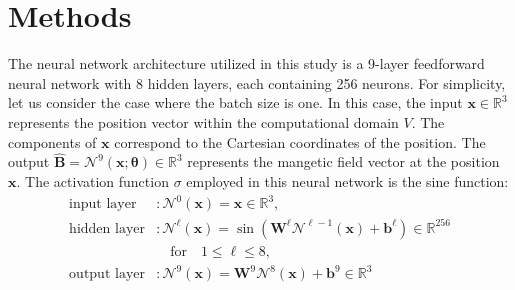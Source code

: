 
\section{Methods}



The neural network architecture utilized in this study is a 9-layer feedforward neural network with 8 hidden layers, each containing 256 neurons. For simplicity, let us consider the case where the batch size is one. In this case, the input $\boldsymbol{x} \in \mathbb{R}^3$ represents the position vector within the computational domain $V$. The components of $\boldsymbol{x}$ correspond to the Cartesian coordinates of the position. The output $\mathbf{\hat{B}}=\mathcal{N}^{9}(\boldsymbol{x}; \boldsymbol{\theta}) \in \mathbb{R}^{3}$ represents the mangetic field vector at the position $\boldsymbol{x}$. The activation function $\sigma$ employed in this neural network is the sine function:
\begin{align*}
    \text{input layer} &: \mathcal{N}^{0}(\boldsymbol{x}) = \boldsymbol{x} \in \mathbb{R}^{3}, \\
    \text{hidden layer} &: \mathcal{N}^{\ell}(\boldsymbol{x}) = \sin(\boldsymbol{W}^{\ell}\mathcal{N}^{\ell-1}(\boldsymbol{x}) + \mathbf{b}^{\ell}) \in \mathbb{R}^{256} \\ & \quad \text{for} \quad 1 \le \ell \le 8, \\
    \text{output layer} &: \mathcal{N}^{9}(\boldsymbol{x}) = \boldsymbol{W}^{9} \mathcal{N}^{8}(\boldsymbol{x}) + \mathbf{b}^{9} \in \mathbb{R}^{3}
\end{align*}

